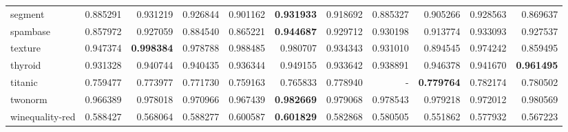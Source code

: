 \begin{tabular}{lrrrrrrrrrr}
segment         &   0.885291 &  0.931219 &  0.926844 &  0.901162 &  \textbf{0.931933} &  0.918692 &  0.885327 &  0.905266 &  0.928563 &  0.869637 \\
spambase        &   0.857972 &  0.927059 &  0.884540 &  0.865221 &  \textbf{0.944687} &  0.929712 &  0.930198 &  0.913774 &  0.933093 &  0.927537 \\
texture         &   0.947374 &  \textbf{0.998384} &  0.978788 &  0.988485 &  0.980707 &  0.934343 &  0.931010 &  0.894545 &  0.974242 &  0.859495 \\
thyroid         &   0.931328 &  0.940744 &  0.940435 &  0.936344 &  0.949155 &  0.933642 &  0.938891 &  0.946378 &  0.941670 &  \textbf{0.961495} \\
titanic         &   0.759477 &  0.773977 &  0.771730 &  0.759163 &  0.765833 &  0.778940 &       - &  \textbf{0.779764} &  0.782174 &  0.780502 \\
twonorm         &   0.966389 &  0.978018 &  0.970966 &  0.967439 &  \textbf{0.982669} &  0.979068 &  0.978543 &  0.979218 &  0.972012 &  0.980569 \\
winequality-red &   0.588427 &  0.568064 &  0.588277 &  0.600587 &  \textbf{0.601829} &  0.582868 &  0.580505 &  0.551862 &  0.577932 &  0.567223 \\
\bottomrule
\end{tabular}

